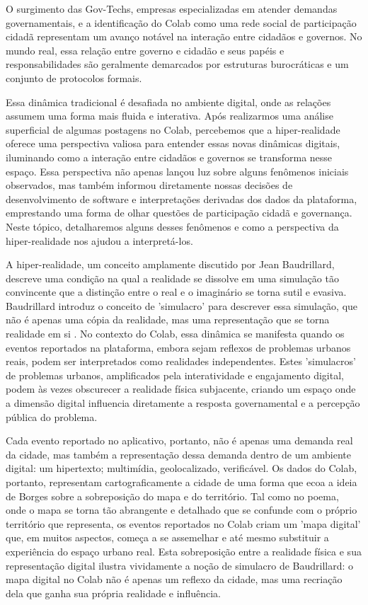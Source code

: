 O surgimento das Gov-Techs, empresas especializadas em atender demandas governamentais, e a identificação do Colab como uma rede social de participação cidadã representam um avanço notável na interação entre cidadãos e governos. No mundo real, essa relação entre governo e cidadão e seus papéis e responsabilidades são geralmente demarcados por estruturas burocráticas e um conjunto de protocolos formais. 

Essa dinâmica tradicional é desafiada no ambiente digital, onde as relações assumem uma forma mais fluida e interativa. Após realizarmos uma análise superficial de algumas postagens no Colab, percebemos que a hiper-realidade oferece uma perspectiva valiosa para entender essas novas dinâmicas digitais, iluminando como a interação entre cidadãos e governos se transforma nesse espaço. Essa perspectiva não apenas lançou luz sobre alguns fenômenos iniciais observados, mas também informou diretamente nossas decisões de desenvolvimento de software e interpretações derivadas dos dados da plataforma, emprestando uma forma de olhar questões de participação cidadã e governança. Neste tópico, detalharemos alguns desses fenômenos e como a perspectiva da hiper-realidade nos ajudou a interpretá-los.

A hiper-realidade, um conceito amplamente discutido por Jean Baudrillard, descreve uma condição na qual a realidade se dissolve em uma simulação tão convincente que a distinção entre o real e o imaginário se torna sutil e evasiva. Baudrillard introduz o conceito de 'simulacro' para descrever essa simulação, que não é apenas uma cópia da realidade, mas uma representação que se torna realidade em si \cite{1994_Baudrillard_BOOK}. No contexto do Colab, essa dinâmica se manifesta quando os eventos reportados na plataforma, embora sejam reflexos de problemas urbanos reais, podem ser interpretados como realidades independentes. Estes 'simulacros' de problemas urbanos, amplificados pela interatividade e engajamento digital, podem às vezes obscurecer a realidade física subjacente, criando um espaço onde a dimensão digital influencia diretamente a resposta governamental e a percepção pública do problema.

Cada evento reportado no aplicativo, portanto, não é apenas uma demanda real da cidade, mas também a representação dessa demanda dentro de um ambiente digital: um hipertexto; multimídia, geolocalizado, verificável. Os dados do Colab, portanto, representam cartograficamente a cidade de uma forma que ecoa a ideia de Borges sobre a sobreposição do mapa e do território. Tal como no poema, onde o mapa se torna tão abrangente e detalhado que se confunde com o próprio território que representa, os eventos reportados no Colab criam um 'mapa digital' que, em muitos aspectos, começa a se assemelhar e até mesmo substituir a experiência do espaço urbano real. Esta sobreposição entre a realidade física e sua representação digital ilustra vividamente a noção de simulacro de Baudrillard: o mapa digital no Colab não é apenas um reflexo da cidade, mas uma recriação dela que ganha sua própria realidade e influência.

